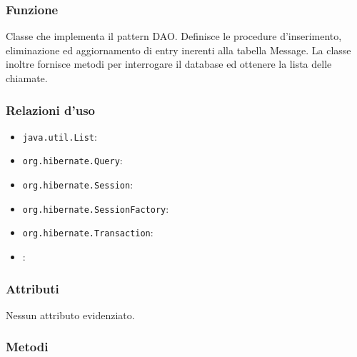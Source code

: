 \begin{description}
\end{description}


\subsubsection*{Funzione}
Classe che implementa il pattern DAO. Definisce le procedure d’inserimento, eliminazione ed aggiornamento di entry inerenti alla tabella Message. La classe inoltre fornisce metodi per interrogare il database ed ottenere la lista delle chiamate.

\subsubsection*{Relazioni d'uso}

\begin{itemize}
	\item \texttt{java.util.List}:
	\item \texttt{org.hibernate.Query}:
	\item \texttt{org.hibernate.Session}:
	\item \texttt{org.hibernate.SessionFactory}:
	\item \texttt{org.hibernate.Transaction}:
	\item {}:
\end{itemize}

\subsubsection*{Attributi}

Nessun attributo evidenziato.

\subsubsection*{Metodi}

